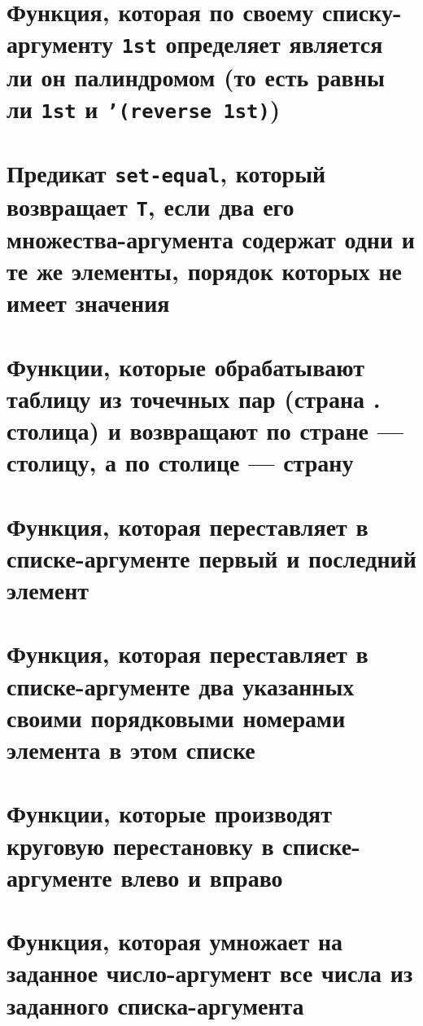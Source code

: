 
\section{Функция, которая по своему списку-аргументу \texttt{1st} определяет является ли он палиндромом (то есть равны ли \texttt{1st} и \texttt{'(reverse 1st)})}



\section{Предикат \texttt{set-equal}, который возвращает \texttt{T}, если два его множества-аргу\-мента содержат одни и те же элементы, порядок которых не имеет значения}




\section{Функции, которые обрабатывают таблицу из точечных пар (страна . столица) и возвращают по стране --- столицу, а по столице --- страну}




\section{Функция, которая переставляет в списке-аргументе первый и последний элемент}



\section{Функция, которая переставляет в списке-аргументе два указанных своими порядковыми номерами элемента в этом списке}



\section{Функции, которые производят круговую перестановку в списке-аргументе влево и вправо}



\section{Функция, которая умножает на заданное число-аргумент все числа из заданного списка-аргумента}


